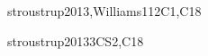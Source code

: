 \begin{syllabus}
\begin{unit}{\PLEventDrivenandReactiveProgramming}{}{stroustrup2013,Williams11}{2}{C1,C18}
\begin{learningoutcomes}
	\item \PLEventDrivenandReactiveProgrammingLOWriteEvent [\Usage]
	\item \PLEventDrivenandReactiveProgrammingLOExplainWhyDriven [\Usage]
	\item \PLEventDrivenandReactiveProgrammingLODescribeAn [\Usage]
\end{learningoutcomes}
\end{unit}

\begin{unit}{\ALBasicAnalysis}{}{stroustrup2013}{3}{CS2,C18}
\begin{topics}
	\item \ALBasicAnalysisTopicDifferences
	\item \ALBasicAnalysisTopicAsymptotic
	\item \ALBasicAnalysisTopicBig
	\item \ALBasicAnalysisTopicComplexity
	\item \ALBasicAnalysisTopicEmpirical
	\item \ALBasicAnalysisTopicTime
	\item \ALBasicAnalysisTopicBigO
	\item \ALBasicAnalysisTopicLittle
	\item \ALBasicAnalysisTopicRecurrence
	\item \ALBasicAnalysisTopicAnalysis
	\item \ALBasicAnalysisTopicSome
\end{topics}

\begin{learningoutcomes}
	\item \ALBasicAnalysisLOExplain [\Usage] 
	\item \ALBasicAnalysisLOIn [\Usage]
	\item \ALBasicAnalysisLODetermine [\Usage]
	\item \ALBasicAnalysisLOState [\Usage]
	\item \ALBasicAnalysisLOList [\Usage]
	\item \ALBasicAnalysisLOPerform [\Usage]
	\item \ALBasicAnalysisLOGive [\Usage]
	\item \ALBasicAnalysisLOUse [\Usage]
	\item \ALBasicAnalysisLOUseBig [\Usage]
	\item \ALBasicAnalysisLOExplainThe [\Usage]
	\item \ALBasicAnalysisLOUseRecurrence [\Usage]
	\item \ALBasicAnalysisLOSolve [\Usage]
\end{learningoutcomes}
\end{unit}


\end{syllabus}

